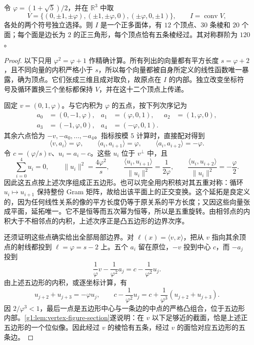 \begin{proposition}
	\label{g1:prop:icosahedron-construction}
	令 \(\varphi=(1+\sqrt5)/2\)，并在 \(\mathbb R^3\) 中取
	\begin{equation}
		\label{g1:eq:icosahedron-vertices}
		V=\{(0,\pm1,\pm\varphi),(\pm1,\pm\varphi,0),
		(\pm\varphi,0,\pm1)\},\qquad I=\operatorname{conv}V,
	\end{equation}
	各处的两个符号独立选择。则 \(I\) 是一个正多面体，有 \(12\) 个顶点、\(30\) 条棱和 \(20\) 个面；每个面是边长为 \(2\) 的正三角形，每个顶点恰有五条棱经过。其对称群阶为 \(120\)。
\end{proposition}
\begin{proof}
	以下只用 \(\varphi^2=\varphi+1\) 作精确计算。所有列出的向量都有平方长度 \(s=\varphi+2\)，且不同向量的内积严格小于 \(s\)，所以每个向量都被自身所定义的线性函数唯一暴露，确为顶点。它们张成三维且成对取负，故原点在 \(I\) 的内部。独立改变坐标符号及循环置换三个坐标都保持 \(V\)，并在这十二个顶点上传递。

	固定 \(v=(0,1,\varphi)\)。与它内积为 \(\varphi\) 的五点，按下列次序记为
	\begin{align*}
		a_0&=(0,-1,\varphi),&a_1&=(\varphi,0,1),&
		a_2&=(1,\varphi,0),\\
		a_3&=(-1,\varphi,0),&a_4&=(-\varphi,0,1).
	\end{align*}
	其余六点恰为 \(-v,-a_0,\ldots,-a_4\)。指标按模 \(5\) 计算时，直接配对得到
	\begin{equation}
		\label{g1:eq:icosahedron-neighbor-gram}
		\langle v,a_i\rangle=\varphi,\qquad
		\langle a_i,a_{i+1}\rangle=\varphi,\qquad
		\langle a_i,a_{i+2}\rangle=-\varphi.
	\end{equation}
	令 \(c=(\varphi/s)v\)、\(u_i=a_i-c\)。这些 \(u_i\) 位于 \(v^\perp\) 中，且
	\[
		\sum_{i=0}^4u_i=0,\qquad
		\lVert u_i\rVert^2=\frac{4\varphi^2}{s},\qquad
		\frac{\langle u_i,u_{i+1}\rangle}{\lVert u_i\rVert^2}
		=\frac1{2\varphi},\qquad
		\frac{\langle u_i,u_{i+2}\rangle}{\lVert u_i\rVert^2}
		=-\frac\varphi2.
	\]
	因此这五点按上述次序组成正五边形。也可以完全用内积核对其五重对称：循环 \(u_i\mapsto u_{i+1}\) 保持整份 Gram 矩阵，故给出该平面上的正交变换。这个延拓是良定义的，因为任何线性关系的像的平方长度仍等于原关系的平方长度；又因这些向量张成平面，延拓唯一。它不是恒等而五次幂为恒等，所以是五重旋转。由相邻点的内积大于不相邻点的内积，上述次序正是凸五边形的边界次序。

	还须证明这些点确实给出全部局部边界。对 \(\ell(x)=\langle v,x\rangle\)，把从 \(v\) 指向其余顶点的射线都投到 \(\ell=\varphi=s-2\) 上。五个 \(a_i\) 留在原位，\(-v\) 投到中心 \(c\)，而 \(-a_j\) 投到
	\[
		\frac1\varphi v-\frac1{\varphi^2}a_j
		=c-\frac1{\varphi^2}u_j.
	\]
	由上述五边形的内积，或逐坐标计算，有
	\[
		u_{j+2}+u_{j+3}=-\varphi u_j,
		\qquad
		c-\frac1{\varphi^2}u_j
		=c+\frac1{\varphi^3}(u_{j+2}+u_{j+3}).
	\]
	因 \(2/\varphi^3<1\)，最后一点是五边形中心与一条边的中点的严格凸组合，位于五边形内部。\cref{g1:lem:vertex-figure-section}遂说明：在 \(v\) 以下足够近的截面，恰是上述正五边形的一个位似像。因此经过 \(v\) 的棱恰有五条，经过 \(v\) 的面恰对应五边形的五条边。


\end{proof}
